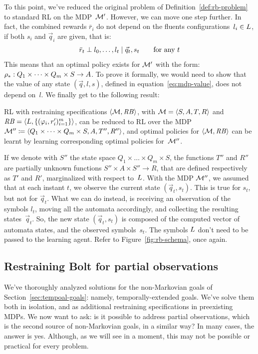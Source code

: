 To this point, we've reduced the original problem of
Definition~\ref{def:rb-problem} to standard RL on the MDP~$\mathcal{M}'$. However,
we can move one step further. In fact, the combined rewards $\bar{r}_i$ do not
depend on the fluents configurations~$l_i \in L$, if both $s_i$
and $\vec{q}_i$ are given, that is:
\[
	\bar{r}_t \perp l_0, \dots, l_t \mid \vec{q}_t, s_t \qquad
	\text{for any $t$}
\]
This means that an optimal policy exists for $\mathcal{M}'$ with the form:
${\rho}_*: Q_1 \times \dots \times Q_m \times S \to A$.
To prove it formally, we would need to show that the value of any state
$(\vec{q}, l, s)$, defined in equation~\eqref{eq:mdp-value}, does not depend
on~$l$. We finally get to the following result:
\begin{theorem}
	\cite{bib:bolt} RL with \ldl{} restraining specifications
	$\langle \mathcal{M}, \text{\textit{RB}} \rangle$, with $\mathcal{M} = \langle S, A, T,
	R \rangle$ and $\text{\textit{RB}} = \langle L, \{(\varphi_i,
	r_i')_{i=1}^m\} \rangle$, can be reduced to RL over the MDP $\mathcal{M}'' \coloneqq
	\langle Q_1 \times \dots \times Q_m \times S, A, T'', R''\rangle$,
	and optimal policies for $\langle \mathcal{M}, \text{\textit{RB}} \rangle$ can be learnt
	by learning corresponding optimal policies for~$\mathcal{M}''$.
	\label{th:bolt-equivalence}
\end{theorem}
If we denote with $S''$ the state space $Q_1 \times \dots \times Q_m \times
S$, the functions $T''$ and $R''$ are partially unknown functions $S'' \times
A \times S'' \to R$, that are defined respectively as $T'$ and $R'$,
marginalized with respect to~$L$. With the MDP $\mathcal{M}''$, we assumed
that at each instant $t$, we observe the current state $(\vec{q}_t, s_t)$.
This is true for $s_t$, but not for $\vec{q}_t$. What we can do instead, is
receiving an observation of the symbols $l_t$, moving all the automata
accordingly, and collecting the resulting states~$\vec{q}_t$. So, the new
state $(\vec{q}_t, s_t)$ is composed of the computed vector of automata
states, and the observed symbols~$s_t$. The symbols $L$ don't need
to be passed to the learning agent. Refer to Figure~\ref{fig:rb-schema}, once
again.


\subsection{Restraining Bolt for partial observations}

\label{sec:rb-for-partial-obs}

We've thoroughly analyzed solutions for the non-Markovian goals of
Section~\ref{sec:tempoal-goals}: namely, temporally-extended goals. We've
solve them both in isolation, and as additional restraining specifications in
preexisting MDPs. We now want to ask: is it possible to address partial
observations, which is the second source of non-Markovian goals, in a similar
way? In many cases, the answer is yes. Although, as we will see in a moment,
this may not be possible or practical for every problem.

